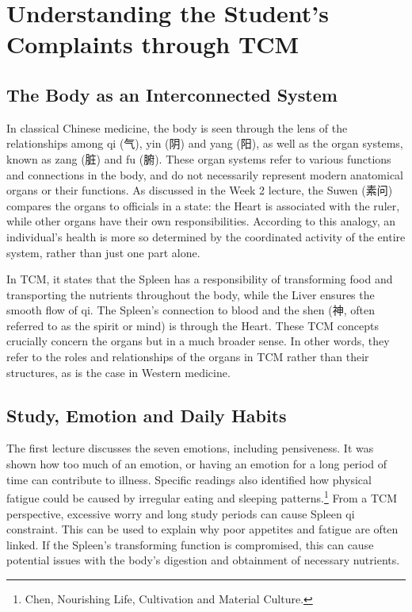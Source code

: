 \documentclass[12pt,a4paper]{article}
\begin{document}
\newpage
\section{Understanding the Student's Complaints through TCM}
\subsection{The Body as an Interconnected System}
In classical Chinese medicine, the body is seen through the lens of the relationships among qi (气), yin (阴) and yang (阳), as well as the organ systems, known as zang (脏) and fu (腑). These organ systems refer to various functions and connections in the body, and do not necessarily represent modern anatomical organs or their functions. As discussed in the Week 2 lecture, the Suwen (素问) compares the organs to officials in a state: the Heart is associated with the ruler, while other organs have their own responsibilities. According to this analogy, an individual's health is more so determined by the coordinated activity of the entire system, rather than just one part alone.

In TCM, it states that the Spleen has a responsibility of transforming food and transporting the nutrients throughout the body, while the Liver ensures the smooth flow of qi. The Spleen's connection to blood and the shen (神, often referred to as the spirit or mind) is through the Heart. These TCM concepts crucially concern the organs but in a much broader sense. In other words, they refer to the roles and relationships of the organs in TCM rather than their structures, as is the case in Western medicine.

\subsection{Study, Emotion and Daily Habits}
The first lecture discusses the seven emotions, including pensiveness. It was shown how too much of an emotion, or having an emotion for a long period of time can contribute to illness. Specific readings also identified how physical fatigue could be caused by irregular eating and sleeping patterns.\footnote{Chen, Nourishing Life, Cultivation and Material Culture.} From a TCM perspective, excessive worry and long study periods can cause Spleen qi constraint. This can be used to explain why poor appetites and fatigue are often linked. If the Spleen's transforming function is compromised, this can cause potential issues with the body's digestion and obtainment of necessary nutrients.
\end{document}
